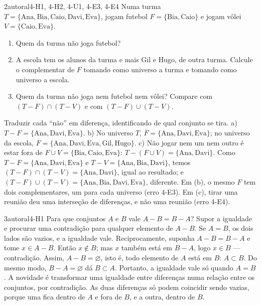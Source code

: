 \begin{exemplo}{}{2}{autoral}{4-H1, 4-H2, 4-U1, 4-E3, 4-E4}
\label{ex:u4:turma}
Numa turma $T=\{\text{Ana},\text{Bia},\text{Caio},\text{Davi},\text{Eva}\}$, jogam futebol $F=\{\text{Bia},\text{Caio}\}$ e jogam vôlei $V=\{\text{Caio},\text{Eva}\}$.
\begin{enumerate}[label=\alph*)]
  \item Quem da turma não joga futebol?
  \item A escola tem os alunos da turma e mais Gil e Hugo, de outra turma. Calcule o complementar de $F$ tomando como universo a turma e tomando como universo a escola.
  \item Quem da turma não joga nem futebol nem vôlei? Compare com $(T-F)\cap(T-V)$ e com $(T-F)\cup(T-V)$.
\end{enumerate}
\plano Traduzir cada \enquote{não} em diferença, identificando de qual conjunto se tira.
\resolucao a) $T-F=\{\text{Ana},\text{Davi},\text{Eva}\}$. b) No universo $T$, $\overline{F}=\{\text{Ana},\text{Davi},\text{Eva}\}$; no universo da escola, $\overline{F}=\{\text{Ana},\text{Davi},\text{Eva},\text{Gil},\text{Hugo}\}$. c) Não jogar nem um nem outro é estar fora de $F\cup V=\{\text{Bia},\text{Caio},\text{Eva}\}$: $T-(F\cup V)=\{\text{Ana},\text{Davi}\}$. Como $T-F=\{\text{Ana},\text{Davi},\text{Eva}\}$ e $T-V=\{\text{Ana},\text{Bia},\text{Davi}\}$, temos $(T-F)\cap(T-V)=\{\text{Ana},\text{Davi}\}$, igual ao resultado; e $(T-F)\cup(T-V)=\{\text{Ana},\text{Bia},\text{Davi},\text{Eva}\}$, diferente.
\comentario Em (b), o mesmo $F$ tem dois complementares, um para cada universo (erro 4-E3). Em (c), tirar uma reunião deu uma interseção de diferenças, e não uma reunião (erro 4-E4).
\end{exemplo}

\begin{exemplo}{}{3}{autoral}{4-H1}
\label{ex:u4:iguais}
Para que conjuntos $A$ e $B$ vale $A-B=B-A$?
\plano Supor a igualdade e procurar uma contradição para qualquer elemento de $A-B$.
\resolucao Se $A=B$, os dois lados são vazios, e a igualdade vale. Reciprocamente, suponha $A-B=B-A$ e tome $x\in A-B$. Então $x\notin B$; mas $x$ também está em $B-A$, logo $x\in B$ — contradição. Assim, $A-B=\varnothing$, isto é, todo elemento de $A$ está em $B$: $A\subset B$. Do mesmo modo, $B-A=\varnothing$ dá $B\subset A$. Portanto, a igualdade vale só quando $A=B$.
\comentario A novidade é transformar uma igualdade entre diferenças numa relação entre os conjuntos, por contradição. As duas diferenças só podem coincidir sendo vazias, porque uma fica dentro de $A$ e fora de $B$, e a outra, dentro de $B$.
\end{exemplo}


